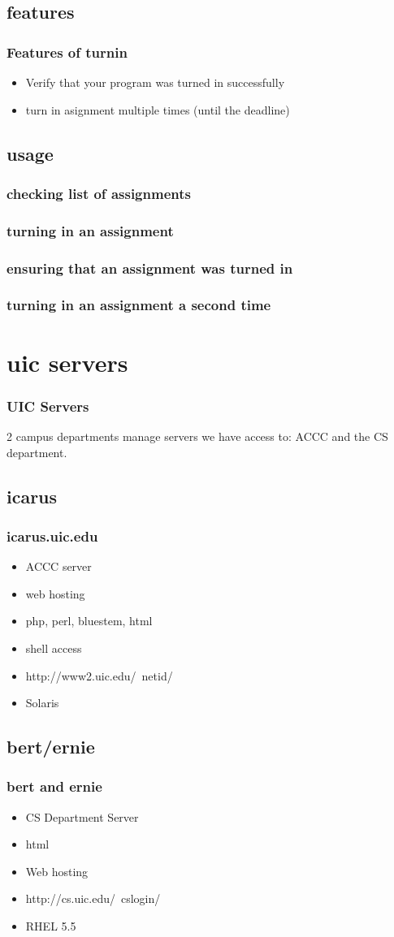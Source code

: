 \documentclass[hyperref={pdfpagelabels=false}]{beamer}
\begin{document}
\subsection{features}
\frame
{
    \frametitle{Features of turnin}
    \begin{itemize}
    \item{Verify that your program was turned in successfully}
    \item{turn in asignment multiple times (until the deadline)}
    \end{itemize}
}
\subsection{usage}
\frame
{
    \frametitle{checking list of assignments}
}
\frame
{
    \frametitle{turning in an assignment}
}
\frame
{
    \frametitle{ensuring that an assignment was turned in}
}
\frame
{
    \frametitle{turning in an assignment a second time}
}
\section{uic servers}
\frame
{
    \frametitle{UIC Servers}
    2 campus departments manage servers we have access to: ACCC and the CS department.
}
\subsection{icarus}
\frame
{
    \frametitle{icarus.uic.edu}
    \begin{itemize}
    \item{ACCC server}
    \item{web hosting}
    \item{php, perl, bluestem, html}
    \item{shell access}
    \item{http://www2.uic.edu/~netid/}
    \item{Solaris}
    \end{itemize}
}
\subsection{bert/ernie}
\frame
{
    \frametitle{bert and ernie}
    \begin{itemize}
    \item{CS Department Server}
    \item{html}
    \item{Web hosting}
    \item{http://cs.uic.edu/~cslogin/}
    \item{RHEL 5.5}
    \end{itemize}
}
\end{document}
